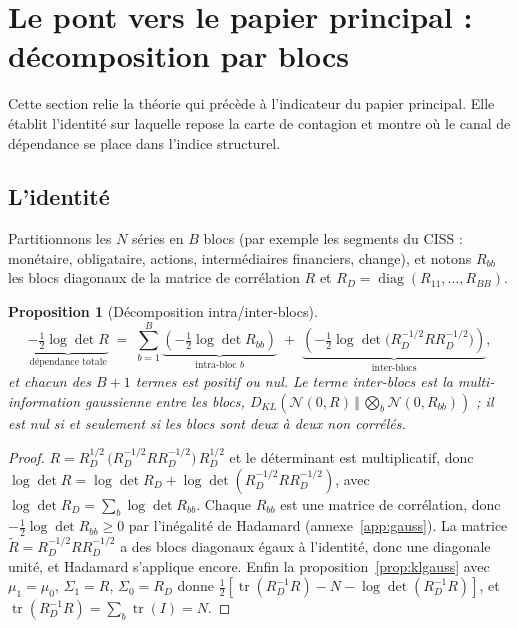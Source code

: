 \documentclass[11pt]{article}
\newtheorem{proposition}{Proposition}
\theoremstyle{definition}
\theoremstyle{remark}
\newcommand{\KL}[2]{D_{KL}\!\left(#1\,\Vert\,#2\right)}
\begin{document}
\section{Le pont vers le papier principal : décomposition par blocs}
\label{sec:blocks}

Cette section relie la théorie qui précède à l'indicateur du papier principal.
Elle établit l'identité sur laquelle repose la \og carte de contagion \fg{} et
montre où le canal de dépendance se place dans l'indice structurel.

\subsection{L'identité}

Partitionnons les $N$ séries en $B$ blocs (par exemple les segments du CISS :
monétaire, obligataire, actions, intermédiaires financiers, change), et notons
$R_{bb}$ les blocs diagonaux de la matrice de corrélation $R$ et
$R_D=\operatorname{diag}(R_{11},\dots,R_{BB})$.

\begin{proposition}[Décomposition intra/inter-blocs]
\label{prop:blocks}
\begin{equation}
\label{eq:blocks}
\underbrace{-\tfrac12\log\det R}_{\text{dépendance totale}}
\;=\;\sum_{b=1}^{B}\underbrace{\left(-\tfrac12\log\det R_{bb}\right)}_{\text{intra-bloc }b}
\;+\;\underbrace{\left(-\tfrac12\log\det\big(R_D^{-1/2}RR_D^{-1/2}\big)\right)}_{\text{inter-blocs}} ,
\end{equation}
et chacun des $B+1$ termes est positif ou nul. Le terme inter-blocs est la
multi-information gaussienne entre les blocs,
$\KL{\mathcal N(0,R)}{\bigotimes_b\mathcal N(0,R_{bb})}$ ; il est nul si et
seulement si les blocs sont deux à deux non corrélés.
\end{proposition}

\begin{proof}
$R=R_D^{1/2}\,\big(R_D^{-1/2}RR_D^{-1/2}\big)\,R_D^{1/2}$ et le déterminant est
multiplicatif, donc $\log\det R=\log\det R_D+\log\det(R_D^{-1/2}RR_D^{-1/2})$, avec
$\log\det R_D=\sum_b\log\det R_{bb}$. Chaque $R_{bb}$ est une matrice de
corrélation, donc $-\tfrac12\log\det R_{bb}\ge0$ par l'inégalité de Hadamard
(annexe~\ref{app:gauss}). La matrice $\tilde R=R_D^{-1/2}RR_D^{-1/2}$ a des blocs
diagonaux égaux à l'identité, donc une diagonale unité, et Hadamard s'applique
encore. Enfin la proposition~\ref{prop:klgauss} avec $\mu_1=\mu_0$,
$\Sigma_1=R$, $\Sigma_0=R_D$ donne
$\tfrac12[\operatorname{tr}(R_D^{-1}R)-N-\log\det(R_D^{-1}R)]$, et
$\operatorname{tr}(R_D^{-1}R)=\sum_b\operatorname{tr}(I)=N$.
\end{proof}
\end{document}
